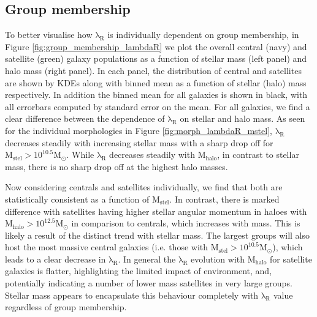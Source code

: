 \subsection{Group membership}
To better visualise how $\mathrm{\lambda_R}$ is individually dependent on group membership, in Figure \ref{fig:group_membership_lambdaR} we plot the overall central (navy) and satellite (green) galaxy populations as a function of stellar mass (left panel) and halo mass (right panel). In each panel, the distribution of central and satellites are shown by KDEs along with binned mean as a function of stellar (halo) mass respectively. In addition the binned mean for all galaxies is shown in black, with all errorbars computed by standard error on the mean. For all galaxies, we find a clear difference between the dependence of $\mathrm{\lambda_R}$ on stellar and halo mass. As seen for the individual morphologies in Figure \ref{fig:morph_lambdaR_mstel}, $\mathrm{\lambda_R}$ decreases steadily with increasing stellar mass with a sharp drop off for $\mathrm{M_{stel} > 10^{10.5}M_{\odot}}$. While $\mathrm{\lambda_R}$ decreases steadily with $\mathrm{M_{halo}}$, in contrast to stellar mass, there is no sharp drop off at the highest halo masses. 

Now considering centrals and satellites individually, we find that both are statistically consistent as a function of $\mathrm{M_{stel}}$. In contrast, there is marked difference with satellites having higher stellar angular momentum in haloes with $\mathrm{M_{halo} > 10^{12.5}M_{\odot}}$ in comparison to centrals, which increases with mass. This is likely a result of the distinct trend with stellar mass. The largest groups will also host the most massive central galaxies (i.e. those with $\mathrm{M_{stel} > 10^{10.5}M_{\odot}}$), which leads to a clear decrease in $\mathrm{\lambda_R}$. In general the $\mathrm{\lambda_R}$ evolution with $\mathrm{M_{halo}}$ for satellite galaxies is flatter, highlighting the limited impact of environment, and, potentially indicating a number of lower mass satellites in very large groups. Stellar mass appears to encapsulate this behaviour completely with $\mathrm{\lambda_R}$ value regardless of group membership.

